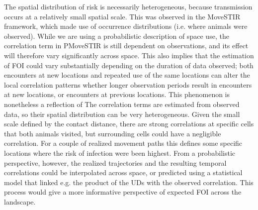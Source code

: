 \documentclass[letterpaper]{article}
\begin{document}
The spatial distribution of risk is necessarily heterogeneous, because transmission occurs at a relatively small spatial scale. This was observed in the MoveSTIR framework, which made use of occurrence distributions (i.e. where animals were observed). 
While we are using a probabilistic description of space use, the correlation term in PMoveSTIR is still dependent on observations, and its effect will therefore vary significantly across space. This also implies that the estimation of FOI could vary substantially depending on the duration of data observed; both encounters at new locations and repeated use of the same locations can alter the local correlation patterns whether longer observation periods result in encounters at new locations, or encounters at previous locations. This phenomenon is nonetheless a reflection of 
The correlation terms are estimated from observed data, so their spatial distribution can be very heterogeneous. Given the small scale defined by the contact distance, there are strong correlations at  specific cells that both animals visited, but surrounding cells could have a negligible correlation. 
For a couple of realized movement paths this defines some specific locations where the risk of infection were been highest. From a probabilistic perspective, however, the realized trajectories and the resulting temporal correlations could be interpolated across space, or predicted using a statistical model that linked e.g. the product of the UDs with the observed correlation. This process would give a more informative perspective of expected FOI across the landscape. 
\end{document}
